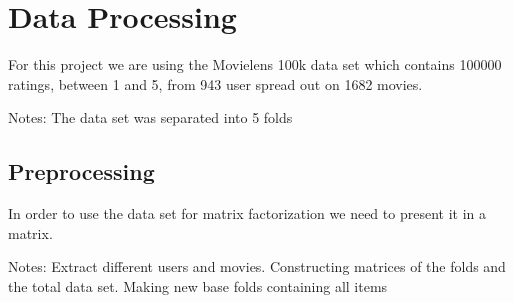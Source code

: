 \section{Data Processing}\label{sec:data_preprocessing}
For this project we are using the Movielens 100k data set which contains 100000 ratings, between 1 and 5, from 943 user spread out on 1682 movies\cite{movielens100k}. 

Notes:
The data set was separated into 5 folds
\subsection{Preprocessing}
In order to use the data set for matrix factorization we need to present it in a matrix. 

Notes: 
Extract different users and movies.
Constructing matrices of the folds and the total data set.
Making new base folds containing all items 

